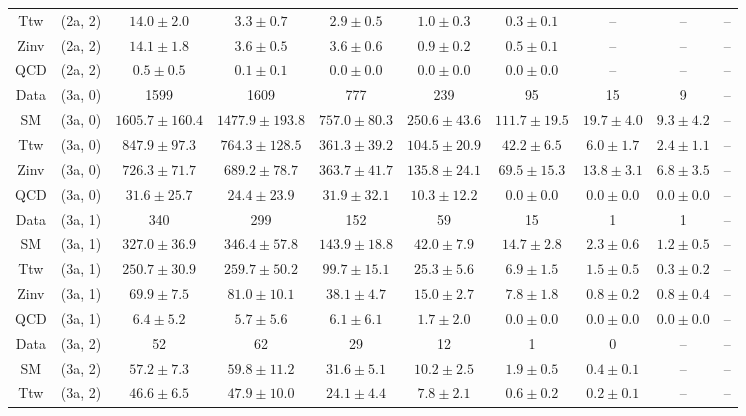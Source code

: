 \begin{table}[h!]
{\begin{tabular}{cccccccccc}
	Ttw & (2a, 2) & $14.0\pm 2.0$ & $3.3\pm 0.7$ & $2.9\pm 0.5$ & $1.0\pm 0.3$ & $0.3\pm 0.1$ & -- & -- & -- \\[0.5ex] 
	Zinv & (2a, 2) & $14.1\pm 1.8$ & $3.6\pm 0.5$ & $3.6\pm 0.6$ & $0.9\pm 0.2$ & $0.5\pm 0.1$ & -- & -- & -- \\[0.5ex] 
	QCD & (2a, 2) & $0.5\pm 0.5$ & $0.1\pm 0.1$ & $0.0\pm 0.0$ & $0.0\pm 0.0$ & $0.0\pm 0.0$ & -- & -- & -- \\[0.5ex] 
	Data & (3a, 0) & 1599 & 1609 & 777 & 239 & 95 & 15 & 9 & -- \\[0.5ex] 
	SM & (3a, 0) & $1605.7\pm 160.4$ & $1477.9\pm 193.8$ & $757.0\pm 80.3$ & $250.6\pm 43.6$ & $111.7\pm 19.5$ & $19.7\pm 4.0$ & $9.3\pm 4.2$ & -- \\[0.5ex] 
	Ttw & (3a, 0) & $847.9\pm 97.3$ & $764.3\pm 128.5$ & $361.3\pm 39.2$ & $104.5\pm 20.9$ & $42.2\pm 6.5$ & $6.0\pm 1.7$ & $2.4\pm 1.1$ & -- \\[0.5ex] 
	Zinv & (3a, 0) & $726.3\pm 71.7$ & $689.2\pm 78.7$ & $363.7\pm 41.7$ & $135.8\pm 24.1$ & $69.5\pm 15.3$ & $13.8\pm 3.1$ & $6.8\pm 3.5$ & -- \\[0.5ex] 
	QCD & (3a, 0) & $31.6\pm 25.7$ & $24.4\pm 23.9$ & $31.9\pm 32.1$ & $10.3\pm 12.2$ & $0.0\pm 0.0$ & $0.0\pm 0.0$ & $0.0\pm 0.0$ & -- \\[0.5ex] 
	Data & (3a, 1) & 340 & 299 & 152 & 59 & 15 & 1 & 1 & -- \\[0.5ex] 
	SM & (3a, 1) & $327.0\pm 36.9$ & $346.4\pm 57.8$ & $143.9\pm 18.8$ & $42.0\pm 7.9$ & $14.7\pm 2.8$ & $2.3\pm 0.6$ & $1.2\pm 0.5$ & -- \\[0.5ex] 
	Ttw & (3a, 1) & $250.7\pm 30.9$ & $259.7\pm 50.2$ & $99.7\pm 15.1$ & $25.3\pm 5.6$ & $6.9\pm 1.5$ & $1.5\pm 0.5$ & $0.3\pm 0.2$ & -- \\[0.5ex] 
	Zinv & (3a, 1) & $69.9\pm 7.5$ & $81.0\pm 10.1$ & $38.1\pm 4.7$ & $15.0\pm 2.7$ & $7.8\pm 1.8$ & $0.8\pm 0.2$ & $0.8\pm 0.4$ & -- \\[0.5ex] 
	QCD & (3a, 1) & $6.4\pm 5.2$ & $5.7\pm 5.6$ & $6.1\pm 6.1$ & $1.7\pm 2.0$ & $0.0\pm 0.0$ & $0.0\pm 0.0$ & $0.0\pm 0.0$ & -- \\[0.5ex] 
	Data & (3a, 2) & 52 & 62 & 29 & 12 & 1 & 0 & -- & -- \\[0.5ex] 
	SM & (3a, 2) & $57.2\pm 7.3$ & $59.8\pm 11.2$ & $31.6\pm 5.1$ & $10.2\pm 2.5$ & $1.9\pm 0.5$ & $0.4\pm 0.1$ & -- & -- \\[0.5ex] 
	Ttw & (3a, 2) & $46.6\pm 6.5$ & $47.9\pm 10.0$ & $24.1\pm 4.4$ & $7.8\pm 2.1$ & $0.6\pm 0.2$ & $0.2\pm 0.1$ & -- & -- \\[0.5ex] 

\end{tabular}}
\end{table}

